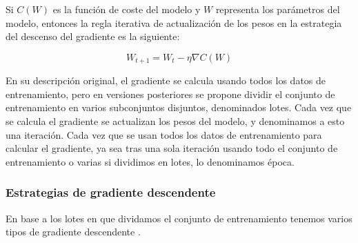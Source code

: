 Si $C(W)$ es la función de coste del modelo y $W$ representa los parámetros del modelo, entonces la regla iterativa de actualización de los pesos en la estrategia del descenso del gradiente es la siguiente:

\begin{equation}\label{eq:GD}
W_{t+1}=W_t - \eta \nabla C(W)
\end{equation}

En su descripción original, el gradiente se calcula usando todos los datos de entrenamiento, pero en versiones posteriores se propone dividir el conjunto de entrenamiento en varios subconjuntos disjuntos, denominados lotes. Cada vez que se calcula el gradiente se actualizan los pesos del modelo, y denominamos a esto una iteración. Cada vez que se usan todos los datos de entrenamiento para calcular el gradiente, ya sea tras una sola iteración usando todo el conjunto de entrenamiento o varias si dividimos en lotes, lo denominamos época.



\subsubsection{Estrategias de gradiente descendente} \label{sec:estrategias}

En base a los lotes en que dividamos el conjunto de entrenamiento tenemos varios tipos de gradiente descendente \cite{GoodFellowBook}.

